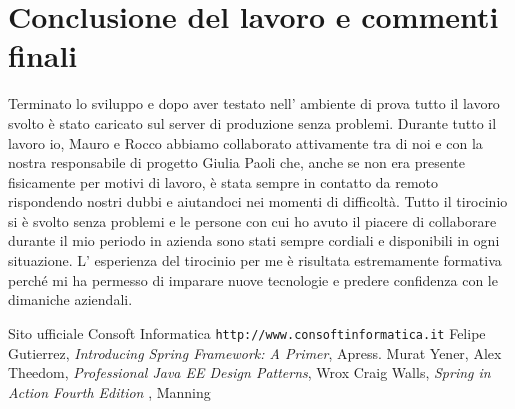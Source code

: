 \documentclass[12pt]{book}
\begin{document}
\chapter{Conclusione del lavoro e commenti finali}
Terminato lo sviluppo e dopo aver testato nell' ambiente di prova tutto 
il lavoro svolto è stato caricato sul server di produzione senza problemi.
Durante tutto il lavoro io, Mauro e Rocco abbiamo collaborato 
attivamente tra di noi e con la nostra responsabile di progetto Giulia Paoli
che, anche
se non era presente fisicamente per motivi di lavoro, è stata sempre in contatto 
da remoto rispondendo nostri dubbi e aiutandoci nei momenti di difficoltà.
Tutto il tirocinio si è svolto senza problemi e le persone con cui ho avuto 
il piacere di collaborare durante il mio periodo in azienda sono stati sempre
cordiali e disponibili in ogni situazione.
L' esperienza del tirocinio per me è risultata estremamente formativa perché
mi ha permesso di imparare nuove tecnologie e predere confidenza con le 
dimaniche aziendali.
\begin{thebibliography}{9}
     Sito ufficiale Consoft Informatica 
    \newline
    \texttt{http://www.consoftinformatica.it}
    Felipe Gutierrez, 
    \emph{Introducing Spring Framework: A Primer}, Apress.
    \newline
    Murat Yener, Alex Theedom,
    \emph{Professional Java EE Design Patterns}, Wrox
    \newline
    Craig Walls,
    \emph{Spring in Action Fourth Edition }, Manning
    \newline
\end{thebibliography}
\end{document}

